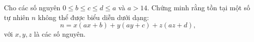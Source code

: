 \ifshowproblem
\begin{problem}\label{example:RUS-2015-TMO-S-P6}
    Cho các số nguyên \( 0 \leq b \leq c \leq d \leq a \) và \( a > 14 \).  
    Chứng minh rằng tồn tại một số tự nhiên \( n \) không thể được biểu diễn dưới dạng:
    \[
        n = x(ax + b) + y(ay + c) + z(az + d),
    \]
    với \( x, y, z \) là các số nguyên.
\end{problem}
\fi

\footnotemark
{}
\fi